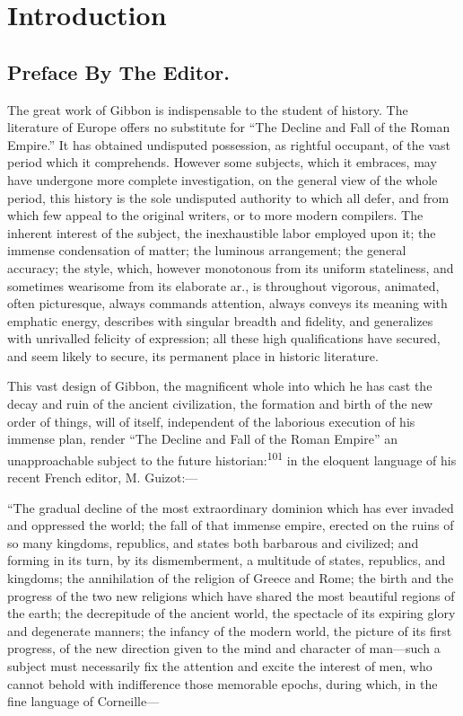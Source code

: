 \section{Introduction}
\subsection{Preface By The Editor.}
\thispagestyle{simple}

The great work of Gibbon is indispensable to the student of history.
The literature of Europe offers no substitute for “The Decline and Fall
of the Roman Empire.” It has obtained undisputed possession, as rightful
occupant, of the vast period which it comprehends. However some subjects,
which it embraces, may have undergone more complete investigation, on the
general view of the whole period, this history is the sole undisputed authority
to which all defer, and from which few appeal to the original writers, or to more
modern compilers. The inherent interest of the subject, the inexhaustible labor
employed upon it; the immense condensation of matter; the luminous arrangement;
the general accuracy; the style, which, however monotonous from its uniform
stateliness, and sometimes wearisome from its elaborate ar., is throughout vigorous,
animated, often picturesque, always commands attention, always conveys its meaning
with emphatic energy, describes with singular breadth and fidelity, and
generalizes with unrivalled felicity of expression; all these high
qualifications have secured, and seem likely to secure, its permanent place
in historic literature.

This vast design of Gibbon, the magnificent whole into which he has cast the
decay and ruin of the ancient civilization, the formation and birth of the
new order of things, will of itself, independent of the laborious execution
of his immense plan, render “The Decline and Fall of the Roman Empire” an
unapproachable subject to the future historian:\textsuperscript{101} in the
eloquent language of his recent French editor, M. Guizot:—


“The gradual decline of the most extraordinary dominion which has ever invaded
and oppressed the world; the fall of that immense empire, erected on the ruins
of so many kingdoms, republics, and states both barbarous and civilized; and
forming in its turn, by its dismemberment, a multitude of states, republics,
and kingdoms; the annihilation of the religion of Greece and Rome; the birth
and the progress of the two new religions which have shared the most beautiful
regions of the earth; the decrepitude of the ancient world, the spectacle of
its expiring glory and degenerate manners; the infancy of the modern world,
the picture of its first progress, of the new direction given to the mind
and character of man—such a subject must necessarily fix the attention and
excite the interest of men, who cannot behold with indifference those
memorable epochs, during which, in the fine language of Corneille—

